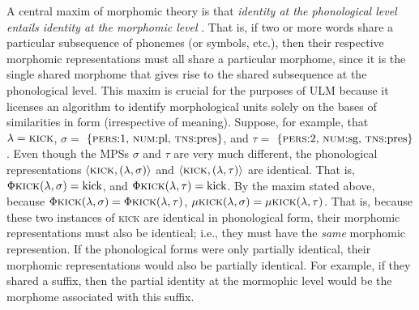 A central maxim of morphomic theory is that \emph{identity at the phonological level entails identity
at the morphomic level} \citep{round:2011}. That is, if two or more words share a particular subsequence of phonemes 
(or symbols, etc.), then their respective 
morphomic representations must all share a particular morphome, since it is the single shared morphome 
that gives rise to the shared subsequence at the phonological level. This maxim is crucial for the purposes 
of \ac{ULM}  because it licenses an algorithm to identify morphological units solely on the bases of similarities in form (irrespective of meaning).
Suppose, for example, that $\lambda = \textsc{kick}$, 
$\sigma =$ $\{\text{\textsc{pers}:1, \textsc{num}:pl,  \textsc{tns}:pres} \}$, 
and $\tau =$ $\{\text{\textsc{pers}:2, \textsc{num}:sg, \textsc{tns}:pres}\}$.
Even though the MPSs $\sigma$ and $\tau$ are very much different,
the phonological representations $\langle \textsc{kick}, (\lambda,\sigma) \rangle$
and $\langle \textsc{kick}, (\lambda,\tau) \rangle$ are identical. That is,
$\Phi{\textsc{kick}}(\lambda,\sigma) = \text{kick}$, and 
$\Phi{\textsc{kick}}(\lambda,\tau) = \text{kick}$. By the maxim stated above, because 
$\Phi{\textsc{kick}}(\lambda,\sigma) =  \Phi{\textsc{kick}}(\lambda,\tau)$, 
$\mu{\textsc{kick}}(\lambda,\sigma) = \mu{\textsc{kick}}(\lambda,\tau)$.
That is, because these two instances of \textsc{kick} are identical in phonological form, their morphomic representations must also be identical; i.e., they must have the \emph{same} morphomic represention. If the phonological forms were only partially identical, their morphomic representations would also be partially identical. For example, if they shared a suffix, then the partial identity at the mormophic level would be the morphome associated with this suffix.

